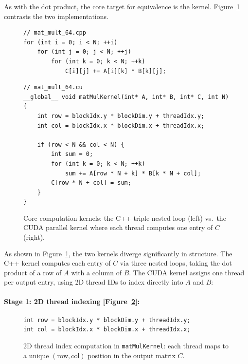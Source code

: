 \documentclass{article}
\begin{document}
As with the dot product, the core target for equivalence is the kernel. Figure~\ref{fig:mat_mult_kernels} contrasts the two implementations.

\begin{figure}[H]
\noindent%
\begin{minipage}[t]{0.49\textwidth}
\begin{verbatim}
// mat_mult_64.cpp
for (int i = 0; i < N; ++i)
    for (int j = 0; j < N; ++j)
        for (int k = 0; k < N; ++k)
            C[i][j] += A[i][k] * B[k][j];
\end{verbatim}
\end{minipage}%
\hfill%
\begin{minipage}[t]{0.49\textwidth}
\begin{verbatim}
// mat_mult_64.cu
__global__ void matMulKernel(int* A, int* B, int* C, int N) {
    int row = blockIdx.y * blockDim.y + threadIdx.y;
    int col = blockIdx.x * blockDim.x + threadIdx.x;

    if (row < N && col < N) {
        int sum = 0;
        for (int k = 0; k < N; ++k)
            sum += A[row * N + k] * B[k * N + col];
        C[row * N + col] = sum;
    }
}
\end{verbatim}
\end{minipage}
    \caption{Core computation kernels: the C++ triple-nested loop (left) vs.\ the CUDA parallel kernel where each thread computes one entry of $C$ (right).}
    \label{fig:mat_mult_kernels}
\end{figure}

As shown in Figure~\ref{fig:mat_mult_kernels}, the two kernels diverge significantly in structure. The C++ kernel computes each entry of $C$ via three nested loops, taking the dot product of a row of $A$ with a column of $B$. The CUDA kernel assigns one thread per output entry, using 2D thread IDs to index directly into $A$ and $B$:

\paragraph{Stage 1: 2D thread indexing [Figure~\ref{fig:mat_mult_thread_idx}]:}

\begin{figure}[H]
\begin{verbatim}
int row = blockIdx.y * blockDim.y + threadIdx.y;
int col = blockIdx.x * blockDim.x + threadIdx.x;
\end{verbatim}
    \caption{2D thread index computation in \texttt{matMulKernel}: each thread maps to a unique $(\text{row}, \text{col})$ position in the output matrix $C$.}
    \label{fig:mat_mult_thread_idx}
\end{figure}
\end{document}
